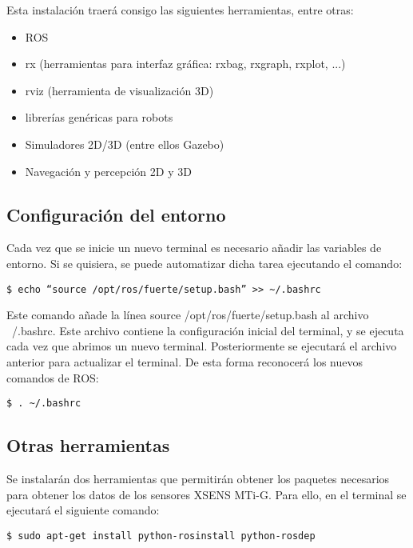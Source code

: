 \documentclass[10pt, a4paper]{report}
\begin{document}
Esta instalación traerá consigo las siguientes herramientas, entre otras:

\begin{itemize}
\item ROS
\item rx (herramientas para interfaz gráfica: rxbag,  rxgraph, rxplot, ...)
\item rviz (herramienta de visualización 3D)
\item librerías genéricas para robots
\item Simuladores 2D/3D (entre ellos Gazebo)
\item Navegación y percepción 2D y 3D
\end{itemize}

\subsection{Configuración del entorno}

Cada vez que se inicie un nuevo terminal es necesario añadir las variables de entorno. Si se quisiera, se puede automatizar dicha tarea ejecutando el comando:

\begin{verbatim}
$ echo “source /opt/ros/fuerte/setup.bash” >> ~/.bashrc
\end{verbatim}

Este comando añade la línea  source /opt/ros/fuerte/setup.bash al archivo ~/.bashrc. Este archivo contiene la configuración inicial del terminal, y se ejecuta cada vez que abrimos un nuevo terminal. Posteriormente se ejecutará el archivo anterior para actualizar el terminal. De esta forma reconocerá los nuevos comandos de ROS:

\begin{verbatim}
$ . ~/.bashrc
\end{verbatim}

\subsection{Otras herramientas}

Se instalarán dos herramientas que permitirán obtener los paquetes necesarios para obtener los datos de los sensores XSENS MTi-G. Para ello, en el terminal se ejecutará el siguiente comando:

\begin{verbatim}
$ sudo apt-get install python-rosinstall python-rosdep
\end{verbatim}
\end{document}
